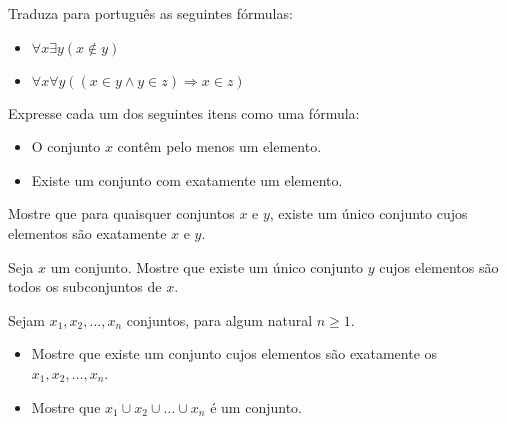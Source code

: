 \begin{exercise}
Traduza para português as seguintes fórmulas:
	\begin{itemize}
		\item $\forall x \exists y (x \not \in y)$
		\item $\forall x \forall y ((x \in y \wedge y \in z) \Rightarrow x \in z)$
	\end{itemize}
\end{exercise}

\begin{exercise}
Expresse cada um dos seguintes itens como uma fórmula:
	\begin{itemize}
		\item O conjunto $x$ contêm pelo menos um elemento.
		\item Existe um conjunto com exatamente um elemento.
	\end{itemize}
\end{exercise}

\begin{exercise}
Mostre que para quaisquer conjuntos $x$ e $y$, existe um único conjunto cujos elementos são exatamente $x$ e $y$.
\end{exercise}

\begin{exercise}
Seja $x$ um conjunto. Mostre que existe um único conjunto $y$ cujos elementos são todos os subconjuntos de $x$.
\end{exercise}

\begin{exercise}
Sejam $x_1, x_2, \dots, x_n$ conjuntos, para algum natural $n \geq 1$.
	\begin{itemize}
		\item Mostre que existe um conjunto cujos elementos são exatamente os $x_1, x_2, \dots, x_n$.
		\item Mostre que $x_1 \cup x_2 \cup \dots \cup x_n$ é um conjunto. 
	\end{itemize}
\end{exercise}